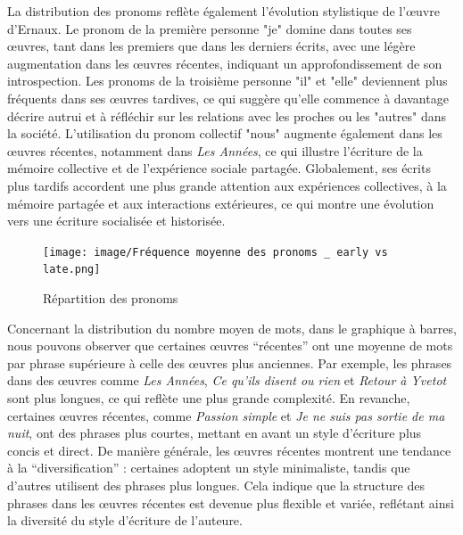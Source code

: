 La distribution des pronoms reflète également l’évolution stylistique de l’œuvre d'Ernaux. Le pronom de la première personne "je" domine dans toutes ses œuvres, tant dans les premiers que dans les derniers écrits, avec une légère augmentation dans les œuvres récentes, indiquant un approfondissement de son introspection. Les pronoms de la troisième personne "il" et "elle" deviennent plus fréquents dans ses œuvres tardives, ce qui suggère qu’elle commence à davantage décrire autrui et à réfléchir sur les relations avec les proches ou les "autres" dans la société. L’utilisation du pronom collectif "nous" augmente également dans les œuvres récentes, notamment dans \textit{Les Années}, ce qui illustre l’écriture de la mémoire collective et de l'expérience sociale partagée. Globalement, ses écrits plus tardifs accordent une plus grande attention aux expériences collectives, à la mémoire partagée et aux interactions extérieures, ce qui montre une évolution vers une écriture socialisée et historisée.\\
\begin{figure}[ht!]
    \centering
    \texttt{[image: image/Fréquence moyenne des pronoms \_ early vs late.png]}
    \caption{Répartition des pronoms}
    \label{fig:repartition_pronom}
\end{figure}

\newpage

Concernant la distribution du nombre moyen de mots, dans le graphique à barres, nous pouvons observer que certaines œuvres ``récentes'' ont une moyenne de mots par phrase supérieure à celle des œuvres plus anciennes. Par exemple, les phrases dans des œuvres comme \textit{Les Années}, \textit{Ce qu'ils disent ou rien} et \textit{Retour à Yvetot} sont plus longues, ce qui reflète une plus grande complexité. En revanche, certaines œuvres récentes, comme \textit{Passion simple} et \textit{Je ne suis pas sortie de ma nuit}, ont des phrases plus courtes, mettant en avant un style d'écriture plus concis et direct. De manière générale, les œuvres récentes montrent une tendance à la ``diversification'' : certaines adoptent un style minimaliste, tandis que d'autres utilisent des phrases plus longues. Cela indique que la structure des phrases dans les œuvres récentes est devenue plus flexible et variée, reflétant ainsi la diversité du style d'écriture de l'auteure. \\

